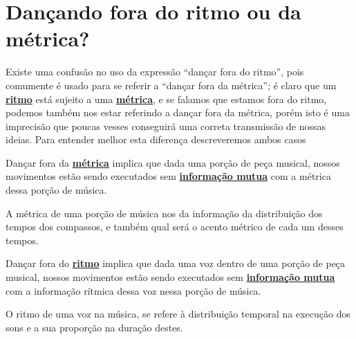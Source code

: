 
\newpage
\section{Dançando fora do ritmo ou da métrica?}

Existe uma confusão no uso da expressão ``dançar fora do ritmo'',
pois comumente é usado para se referir a ``dançar fora da métrica'';
é claro que um \hyperref[sec:pos:Ritmo]{\textbf{ritmo}} está sujeito a uma \hyperref[def:Metrica]{\textbf{métrica}}, 
e se falamos que estamos fora do ritmo,
podemos também nos estar referindo a  dançar fora da métrica, 
porém isto é uma imprecisão que poucas vesses conseguirá
uma correta transmissão de nossas ideias.
Para entender melhor esta diferença descreveremos ambos casos


\begin{definition}
Dançar fora da \hyperref[def:Metrica]{\textbf{métrica}}
 implica que dada uma porção de peça musical,
nossos movimentos estão sendo executados sem 
\hyperref[sec:musicalidadeinfmutua]{\textbf{informação mutua}} com a métrica
dessa porção de música.

A métrica de uma porção de música nos da informação da distribuição
dos tempos dos compassos, e também qual será o acento métrico de cada um desses tempos.
\end{definition}

\begin{definition}
\label{def:fora-do-ritmo}
Dançar fora do \hyperref[sec:pos:Ritmo]{\textbf{ritmo}}
implica que dada uma voz dentro de uma porção de peça musical,
nossos movimentos estão sendo executados sem 
\hyperref[sec:musicalidadeinfmutua]{\textbf{informação mutua}} com a 
informação rítmica dessa voz nessa porção de música.

O ritmo de uma voz na música, 
se refere à distribuição temporal na execução dos sons e a sua proporção na duração
destes.
\end{definition}

